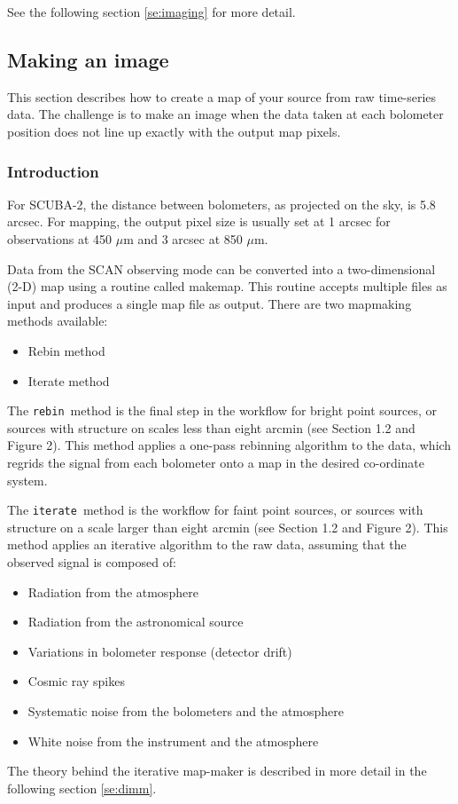 \documentclass[twoside,11pt]{article}
\newcommand{\xref}[3]{#1}
\newcommand{\xlabel}[1]{}
\renewcommand{\_}{\texttt{\symbol{95}}}
\newcommand{\task}[1]{\textsf{#1}}
\newcommand{\makemap}{\xref{\task{makemap}}{sun258}{MAKEMAP}}
\newcommand{\rebin}{\texttt{rebin}}
\newcommand{\iterate}{\texttt{iterate}}
\begin{document}
See the following section \ref{se:imaging} for more detail.

\subsection{\xlabel{imaging}Making an image\label{se:imaging}}

This section describes how to create a map of your source from raw
time-series data. The challenge is to make an image when the data
taken at each bolometer position does not line up exactly with the
output map pixels.

\subsubsection{Introduction}

For SCUBA-2, the distance between bolometers, as projected on the sky,
is 5.8 arcsec. For mapping, the output pixel size is usually set at 1
arcsec for observations at 450 $\mu$m and 3 arcsec at 850 $\mu$m.

Data from the SCAN observing mode can be converted into a
two-dimensional (2-D) map using a routine called \makemap. This
routine accepts multiple files as input and produces a single map file
as output. There are two mapmaking methods available:
\begin{itemize}
\item Rebin method
\item Iterate method
\end{itemize}

The \rebin\ method is the final step in the workflow for bright point
sources, or sources with structure on scales less than eight arcmin
(see Section 1.2 and Figure 2). This method applies a one-pass
rebinning algorithm to the data, which regrids the signal from each
bolometer onto a map in the desired co-ordinate system.

The \iterate\ method is the workflow for faint point sources, or
sources with structure on a scale larger than eight arcmin (see
Section 1.2 and Figure 2). This method applies an iterative algorithm
to the raw data, assuming that the observed signal is composed of:
\begin{itemize}
\item Radiation from the atmosphere
\item Radiation from the astronomical source
\item Variations in bolometer response (detector drift)
\item Cosmic ray spikes
\item Systematic noise from the bolometers and the atmosphere
\item White noise from the instrument and the atmosphere
\end{itemize}
The theory behind the iterative map-maker is described in more detail
in the following section \ref{se:dimm}.
\end{document}
